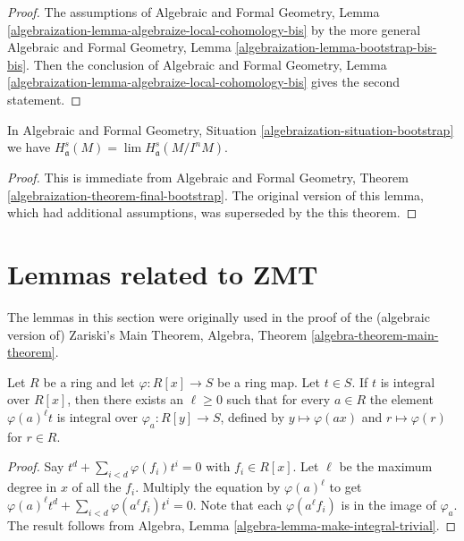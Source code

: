 \begin{proof}
The assumptions of Algebraic and Formal Geometry, Lemma
\ref{algebraization-lemma-algebraize-local-cohomology-bis}
by the more general Algebraic and Formal Geometry, Lemma
\ref{algebraization-lemma-bootstrap-bis-bis}.
Then the conclusion of Algebraic and Formal Geometry, Lemma
\ref{algebraization-lemma-algebraize-local-cohomology-bis}
gives the second statement.
\end{proof}

\begin{lemma}
\label{lemma-combine-one}
In Algebraic and Formal Geometry, Situation
\ref{algebraization-situation-bootstrap}
we have $H^s_\mathfrak a(M) = \lim H^s_\mathfrak a(M/I^nM)$.
\end{lemma}

\begin{proof}
This is immediate from Algebraic and Formal Geometry, Theorem
\ref{algebraization-theorem-final-bootstrap}.
The original version of this lemma, which had additional
assumptions, was superseded by the this theorem.
\end{proof}






\section{Lemmas related to ZMT}
\label{section-ZMT}

\noindent
The lemmas in this section were originally used in the proof of the
(algebraic version of) Zariski's Main Theorem,
Algebra, Theorem \ref{algebra-theorem-main-theorem}.

\begin{lemma}
\label{lemma-change-equation-multiply}
Let $R$ be a ring and let $\varphi : R[x] \to S$ be
a ring map. Let $t \in S$. If $t$ is integral over
$R[x]$, then there exists an $\ell \geq 0$ such that
for every $a \in R$ the element $\varphi(a)^\ell t$
is integral over $\varphi_a : R[y] \to S$, defined by
$y \mapsto \varphi(ax)$ and $r \mapsto \varphi(r)$
for $r\in R$.
\end{lemma}

\begin{proof}
Say $t^d + \sum_{i < d} \varphi(f_i)t^i = 0$
with $f_i \in R[x]$. Let $\ell$ be the maximum degree
in $x$ of all the $f_i$. Multiply the equation
by $\varphi(a)^\ell$ to get
$\varphi(a)^\ell t^d + \sum_{i < d} \varphi(a^\ell f_i)t^i = 0$.
Note that each $\varphi(a^\ell f_i)$ is in the image of
$\varphi_a$. The result follows from
Algebra, Lemma \ref{algebra-lemma-make-integral-trivial}.
\end{proof}

